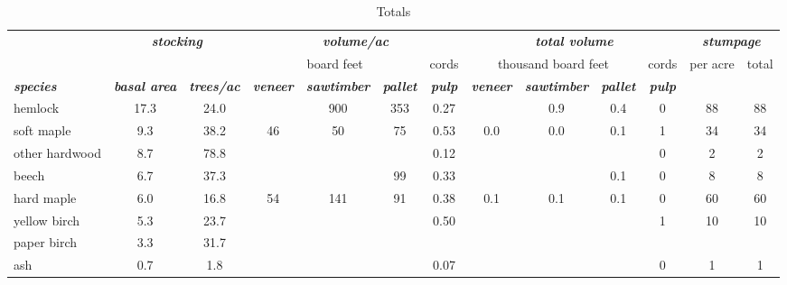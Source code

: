 \documentclass[landscape]{article}
\begin{document}
\begin{table}[H]

\caption{\label{tab:unnamed-chunk-37}Totals}
\fontsize{10}{12}\selectfont
\begin{tabular}[t]{lcccccccccccc}
\toprule
\multicolumn{1}{c}{\em{\textbf{ }}} & \multicolumn{2}{c}{\em{\textbf{stocking}}} & \multicolumn{4}{c}{\em{\textbf{volume/ac }}} & \multicolumn{4}{c}{\em{\textbf{total volume}}} & \multicolumn{2}{c}{\em{\textbf{stumpage}}} \\
\cmidrule(l{3pt}r{3pt}){2-3} \cmidrule(l{3pt}r{3pt}){4-7} \cmidrule(l{3pt}r{3pt}){8-11} \cmidrule(l{3pt}r{3pt}){12-13}
\multicolumn{3}{c}{ } & \multicolumn{3}{c}{board feet} & \multicolumn{1}{c}{cords} & \multicolumn{3}{c}{thousand board feet} & \multicolumn{1}{c}{cords} & \multicolumn{1}{c}{per acre} & \multicolumn{1}{c}{total} \\
\cmidrule(l{3pt}r{3pt}){4-6} \cmidrule(l{3pt}r{3pt}){7-7} \cmidrule(l{3pt}r{3pt}){8-10} \cmidrule(l{3pt}r{3pt}){11-11} \cmidrule(l{3pt}r{3pt}){12-12} \cmidrule(l{3pt}r{3pt}){13-13}
\rowcolor[HTML]{DCDCDC}  \em{\textbf{species}} & \em{\textbf{basal area}} & \em{\textbf{trees/ac}} & \em{\textbf{veneer}} & \em{\textbf{sawtimber}} & \em{\textbf{pallet}} & \em{\textbf{pulp}} & \em{\textbf{veneer}} & \em{\textbf{sawtimber}} & \em{\textbf{pallet}} & \em{\textbf{pulp}} & \em{\textbf{ }} & \em{\textbf{ }}\\
\midrule
\rowcolor{gray!6}  hemlock & 17.3 & 24.0 &  & 900 & 353 & 0.27 &  & 0.9 & 0.4 & 0 & 88 & 88\\
 
soft maple & 9.3 & 38.2 & 46 & 50 & 75 & 0.53 & 0.0 & 0.0 & 0.1 & 1 & 34 & 34\\
 
\rowcolor{gray!6}  other hardwood & 8.7 & 78.8 &  &  &  & 0.12 &  &  &  & 0 & 2 & 2\\
 
beech & 6.7 & 37.3 &  &  & 99 & 0.33 &  &  & 0.1 & 0 & 8 & 8\\
 
\rowcolor{gray!6}  hard maple & 6.0 & 16.8 & 54 & 141 & 91 & 0.38 & 0.1 & 0.1 & 0.1 & 0 & 60 & 60\\
 
yellow birch & 5.3 & 23.7 &  &  &  & 0.50 &  &  &  & 1 & 10 & 10\\
 
\rowcolor{gray!6}  paper birch & 3.3 & 31.7 &  &  &  &  &  &  &  &  &  & \\
 
ash & 0.7 & 1.8 &  &  &  & 0.07 &  &  &  & 0 & 1 & 1\\
 

\end{tabular}
\end{table}
\end{document}
